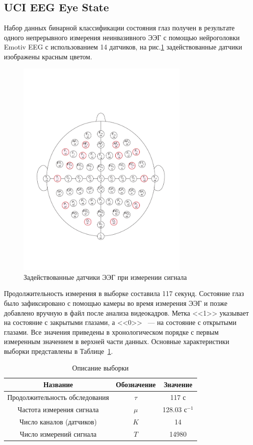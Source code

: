 \documentclass[a4paper, 12pt]{extarticle}
\begin{document}
\subsection{UCI EEG Eye State}
Набор данных бинарной классификации состояния глаз получен в результате одного непрерывного измерения неинвазивного ЭЭГ с 
помощью нейроголовки Emotiv EEG с использованием 14 датчиков, на рис.\ref{fig:1} задействованные датчики
изображены красным цветом. 
\begin{figure}[h]
	\centering
	\includegraphics[width=0.75\textwidth]{64_channel_sharbrough.pdf}
	\caption{Задействованные датчики ЭЭГ при измерении сигнала}
	\label{fig:1}
\end{figure}


Продолжительность измерения в выборке составила 117 секунд. 
Состояние глаз было зафиксировано с помощью камеры во время измерения ЭЭГ и позже добавлено 
вручную в файл после анализа видеокадров. Метка <<1>> указывает на состояние с закрытыми глазами, а 
<<0>> ~--- на состояние с открытыми глазами. Все значения приведены в хронологическом порядке с 
первым измеренным значением в верхней части данных.
Основные характеристики выборки представлены в
Таблице~\ref{table:sample}.

\begin{table}
	\centering
	\caption{Описание выборки}
	\begin{tabular}{|c|c|c|}
		\hline
		Название                       & Обозначение & Значение             \\
		\hline \hline
		Продолжительность обследования & $\tau$         & 117 с                \\ \hline
		Частота измерения сигнала      & $\mu$       & 128.03 $\text{с}^{-1}$   \\ \hline
	    Число каналов (датчиков)    & $K$   & 14          \\ \hline
		Число измерений сигнала             & $T$  & 14980           \\ \hline
	\end{tabular}
	\label{table:sample}
\end{table}
\end{document}
